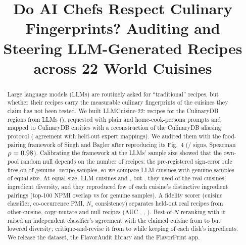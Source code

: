 \documentclass[conference]{IEEEtran}
\newcommand{\Ns}{N_s}
\begin{document}
\title{Do AI Chefs Respect Culinary Fingerprints? Auditing and Steering LLM-Generated Recipes across 22 World Cuisines}

\author{
}

\maketitle

\begin{abstract}
Large language models (LLMs) are routinely asked for ``traditional'' recipes, but whether their recipes carry the measurable culinary fingerprints of the cuisines they claim has not been tested. We built LLMCuisine-22: \NRecipesTotal{} recipes for the \NRegions{} CulinaryDB regions from \NModelsDone{} LLMs (\NModelNamesDone), requested with plain and home-cook-persona prompts and mapped to CulinaryDB entities with a reconstruction of the CulinaryDB aliasing protocol (\NAliasAccLinesPct{} agreement with held-out expert mappings). We audited them with the food-pairing framework of Singh and Bagler after reproducing its Fig.~4 (\NReplRandomSigns/\NReplRandomN{} signs, Spearman $\rho=0.98$). Calibrating the framework at the LLMs' sample size showed that the own-pool random null depends on the number of recipes: the pre-registered sign-error rule fires on \NFPRatePct{} of genuine \NLLMN-recipe samples, so we compare LLM cuisines with genuine samples of equal size. At equal size, LLM cuisines \NFindingPairing{} and \NFindingSAI, but \NFindingFingerprint, they used \NDivRangePct{} of the real cuisines' ingredient diversity, and they reproduced few of each cuisine's distinctive ingredient pairings (top-100 NPMI overlap \NNetHundredRange{} vs \NNetHundredRef{} for genuine samples). \NFindingCM{} A fidelity scorer (cuisine classifier, co-occurrence PMI, $\Ns$ consistency) separates held-out real recipes from other-cuisine, copy-mutate and null recipes (AUC \NAucOtherComposite, \NAucCMComposite, \NAucNullComposite). Best-of-$N$ reranking with it raised an independent classifier's agreement with the claimed cuisine from \NBonClfLowRange{} to \NBonClfHighRange{} but lowered diversity; critique-and-revise \NReviseVerb{} it from \NReviseClfStartRange{} to \NReviseClfEndRange{} while keeping \NReviseIdentityPctRange{} of each dish's ingredients. We release the dataset, the FlavorAudit library and the FlavorPrint app.
\end{abstract}
\end{document}
